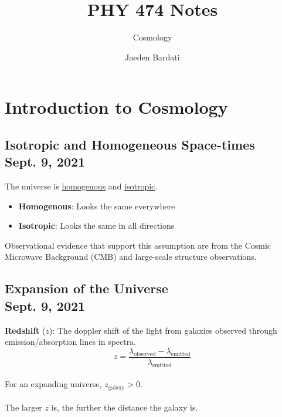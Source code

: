 \documentclass[]{article}
\title{PHY 474 Notes}
\subtitle{Cosmology}
\author{Jaeden Bardati}
\begin{document}
\maketitle
\bigbreak

\section{Introduction to Cosmology}
\bigbreak

\subsection{Isotropic and Homogeneous Space-times\\ {\large \normalfont Sept. 9, 2021}}
\bigbreak

The universe is \underline{homogenous} and \underline{isotropic}.\\

\begin{itemize}
	\renewcommand{\labelitemi}{$\Rightarrow$}
	\item \textbf{Homogenous}: Looks the same everywhere
	\item \textbf{Isotropic}: Looks the same in all directions\\
\end{itemize}

Observational evidence that support this assumption are from the Cosmic Microwave Background (CMB) and large-scale structure observations. \\

\subsection{Expansion of the Universe\\ {\large \normalfont Sept. 9, 2021}}
\bigbreak

\textbf{Redshift} ($z$): The doppler shift of the light from galaxies observed through emission/absorption lines in spectra.\\

\begin{equation}
	z = \frac{\lambda_{\mathrm{observed}} - \lambda_{\mathrm{emitted}}}{\lambda_{\mathrm{emitted}}}
\end{equation}\\

For an expanding universe, $z_{\mathrm{galaxy}} > 0$.\\\\
The larger $z$ is, the further the distance the galaxy is. 
\end{document}
